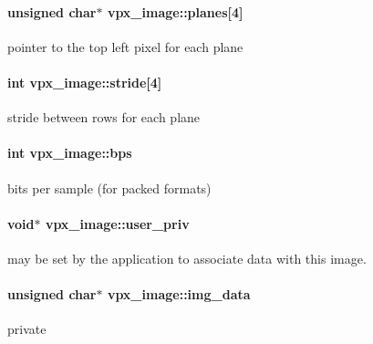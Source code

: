 \paragraph[{\texorpdfstring{planes}{planes}}]{\setlength{\rightskip}{0pt plus 5cm}unsigned char$\ast$ vpx\+\_\+image\+::planes\mbox{[}4\mbox{]}}\hypertarget{structvpx__image_ab6258308ba7a5f4a113348120e20e2ce}{}\label{structvpx__image_ab6258308ba7a5f4a113348120e20e2ce}
pointer to the top left pixel for each plane 
\paragraph[{\texorpdfstring{stride}{stride}}]{\setlength{\rightskip}{0pt plus 5cm}int vpx\+\_\+image\+::stride\mbox{[}4\mbox{]}}\hypertarget{structvpx__image_ac9c7b83e3eea44cb680956f90dc789cf}{}\label{structvpx__image_ac9c7b83e3eea44cb680956f90dc789cf}
stride between rows for each plane 
\paragraph[{\texorpdfstring{bps}{bps}}]{\setlength{\rightskip}{0pt plus 5cm}int vpx\+\_\+image\+::bps}\hypertarget{structvpx__image_a53a02fad822151eb8eeb2f64f195e1f6}{}\label{structvpx__image_a53a02fad822151eb8eeb2f64f195e1f6}
bits per sample (for packed formats) 
\paragraph[{\texorpdfstring{user\+\_\+priv}{user_priv}}]{\setlength{\rightskip}{0pt plus 5cm}void$\ast$ vpx\+\_\+image\+::user\+\_\+priv}\hypertarget{structvpx__image_a28ae6c046dfca87de4fca4e67cab563d}{}\label{structvpx__image_a28ae6c046dfca87de4fca4e67cab563d}
may be set by the application to associate data with this image. 
\paragraph[{\texorpdfstring{img\+\_\+data}{img_data}}]{\setlength{\rightskip}{0pt plus 5cm}unsigned char$\ast$ vpx\+\_\+image\+::img\+\_\+data}\hypertarget{structvpx__image_a3c9b7a7a68e4a9665b47433a1e96d78b}{}\label{structvpx__image_a3c9b7a7a68e4a9665b47433a1e96d78b}
private 
